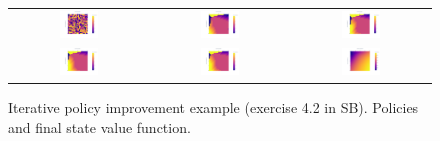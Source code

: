 \begin{figure}
\begin{tabular}{ccc}
\includegraphics[width=0.3\textwidth]{rl_into/jacks_init_random/jacks_pi_iteration_0.png} &
\includegraphics[width=0.3\textwidth]{rl_into/jacks_init_random/jacks_pi_iteration_1.png} &
\includegraphics[width=0.3\textwidth]{rl_into/jacks_init_random/jacks_pi_iteration_2.png} \\
\includegraphics[width=0.3\textwidth]{rl_into/jacks_init_random/jacks_pi_iteration_3.png} &
\includegraphics[width=0.3\textwidth]{rl_into/jacks_init_random/jacks_pi_iteration_4.png} &
\includegraphics[width=0.3\textwidth]{rl_into/jacks_init_random/jacks_V_iteration_4.png}
\end{tabular}
\caption[Iterative policy improvement example]{Iterative policy improvement example (exercise 4.2 in SB). Policies and final state value function.}
\label{fig:jackscars}
\end{figure}


